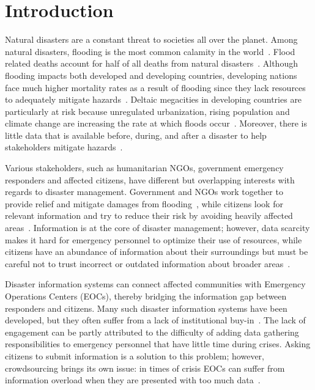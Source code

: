 \chapter{Introduction} Natural disasters are a constant threat to societies all
over the planet. Among natural disasters, flooding is the most common calamity
in the world~\cite{chanFloodRiskAsia2012}.  Flood related deaths account for
half of all deaths from natural disasters~\cite{ohlFloodingHumanHealth2000}.
Although flooding impacts both developed and developing countries, developing
nations face much higher mortality rates as a result of flooding since they lack
resources to adequately mitigate
hazards~\cite{quarantelliUrbanVulnerabilityDisasters2003,
ahernGlobalHealthImpacts2005}. Deltaic megacities in
developing countries are particularly at risk because unregulated
urbanization, rising population and climate change are increasing the rate at
which floods occur~\cite{chanFloodRiskAsia2012}. Moreover, there is little data
that is available before, during, and after a disaster to help stakeholders
mitigate hazards~\cite{meierDigitalHumanitariansHow2015}.

Various stakeholders, such as humanitarian NGOs, government emergency
responders and affected citizens, have
different but overlapping interests with regards to disaster management.
Government and NGOs work together to provide relief and mitigate damages from
flooding~\cite{chanResilientFloodRisk2018}, while citizens
look for relevant information and try to reduce their
risk by avoiding heavily affected
areas~\cite{viewegMicrobloggingTwoNatural2010}. Information is at the core of
disaster management; however, data scarcity makes it hard for emergency
personnel to optimize their use of resources, while citizens have an abundance
of information about their surroundings but must be careful not to trust
incorrect or outdated information about broader
areas~\cite{quarantelliProblematicalAspectsInformation1997}.

Disaster information systems can connect affected communities with
Emergency Operations Centers (EOCs), thereby bridging the information gap
between responders and citizens. Many such disaster information systems have
been developed, but they often suffer from a lack of institutional
buy-in~\cite{aminDataNaturalDisasters2008}. The lack of engagement can be partly
attributed to the difficulty of adding data gathering responsibilities to
emergency personnel that have little time during crises. Asking citizens to
submit information is a solution to this problem; however, crowdsourcing brings
its own issue: in times of crisis EOCs can suffer from information overload when
they are presented with too much
data~\cite{tierneyFacingUnexpectedDisaster2001}.

